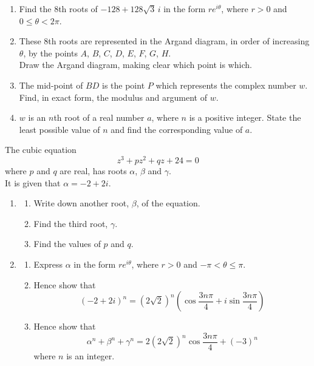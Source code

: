 \documentclass[leqno]{article}
\begin{document}
\begin{enumerate}[
  label=\textbf{\arabic*.},
  leftmargin=*,
  topsep=0pt,
  partopsep=0pt,
  parsep=0pt
]
\begin{enumerate}[label=\textbf{(\roman*)}]
  \item Find the $8$th roots of $-128+128\sqrt{3}\,i$ in the form $re^{i\theta}$, where $r>0$ and $0\leq \theta<2\pi$.  \\
  \item These $8$th roots are represented in the Argand diagram, in order of increasing $\theta$, by the points $A$, $B$, $C$, $D$, $E$, $F$, $G$, $H$. \\
  Draw the Argand diagram, making clear which point is which.  \\
  \item The mid-point of $BD$ is the point $P$ which represents the complex number $w$. \\
  Find, in exact form, the modulus and argument of $w$.  \\
  \item $w$ is an $n$th root of a real number $a$, where $n$ is a positive integer. State the least possible value of $n$ and find the corresponding value of $a$.  \\
\end{enumerate}

\newpage


\questionitem

The cubic equation
\[
z^3+pz^2+qz+24=0
\]
where $p$ and $q$ are real, has roots $\alpha$, $\beta$ and $\gamma$. \\
It is given that $\alpha=-2+2i$. \\
\begin{enumerate}[label=\textbf{(\alph*)}]
  \item
  \begin{enumerate}[label=(\roman*)]
    \item Write down another root, $\beta$, of the equation. 
    \item Find the third root, $\gamma$. 
    \item Find the values of $p$ and $q$.  \\
  \end{enumerate}
  \item
  \begin{enumerate}[label=(\roman*)]
    \item Express $\alpha$ in the form $re^{i\theta}$, where $r>0$ and $-\pi<\theta\leq \pi$. 
    \item Hence show that
    \[
    (-2+2i)^n=(2\sqrt{2})^n\left(\cos \frac{3n\pi}{4}+i\sin \frac{3n\pi}{4}\right)
    \]
    \item Hence show that
    \[
    \alpha^n+\beta^n+\gamma^n=2(2\sqrt{2})^n\cos \frac{3n\pi}{4}+(-3)^n
    \]
    where $n$ is an integer. 
  \end{enumerate}
\end{enumerate}


\end{enumerate}
\end{document}
